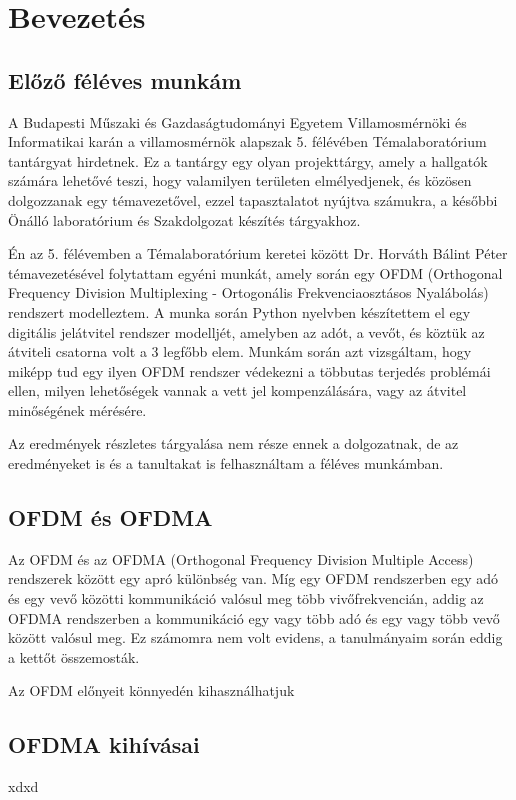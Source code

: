 \chapter{Bevezetés}

\section{Előző féléves munkám}

A Budapesti Műszaki és Gazdaságtudományi Egyetem Villamosmérnöki és Informatikai karán a villamosmérnök alapszak 5. félévében Témalaboratórium tantárgyat hirdetnek.
Ez a tantárgy egy olyan projekttárgy, amely a hallgatók számára lehetővé teszi, hogy valamilyen területen elmélyedjenek, és közösen dolgozzanak egy témavezetővel, ezzel tapasztalatot nyújtva számukra, a későbbi Önálló laboratórium és Szakdolgozat készítés tárgyakhoz.

Én az 5. félévemben a Témalaboratórium keretei között Dr. Horváth Bálint Péter témavezetésével folytattam egyéni munkát, amely során egy OFDM (Orthogonal Frequency Division Multiplexing - Ortogonális Frekvenciaosztásos Nyalábolás) rendszert modelleztem. A munka során Python nyelvben készítettem el egy digitális jelátvitel rendszer modelljét, amelyben az adót, a vevőt, és köztük az átviteli csatorna volt a 3 legfőbb elem. Munkám során azt vizsgáltam, hogy miképp tud egy ilyen OFDM rendszer védekezni a többutas terjedés problémái ellen, milyen lehetőségek vannak a vett jel kompenzálására, vagy az átvitel minőségének mérésére.

Az eredmények részletes tárgyalása nem része ennek a dolgozatnak, de az eredményeket is és a tanultakat is felhasználtam a féléves munkámban.

\section{OFDM és OFDMA}

Az OFDM és az OFDMA (Orthogonal Frequency Division Multiple Access) rendszerek között egy apró különbség van. Míg egy OFDM rendszerben egy adó és egy vevő közötti kommunikáció valósul meg több vivőfrekvencián, addig az OFDMA rendszerben a kommunikáció egy vagy több adó és egy vagy több vevő között valósul meg. Ez számomra nem volt evidens, a tanulmányaim során eddig a kettőt összemosták.

Az OFDM előnyeit könnyedén kihasználhatjuk  

\section{OFDMA kihívásai}

xdxd
